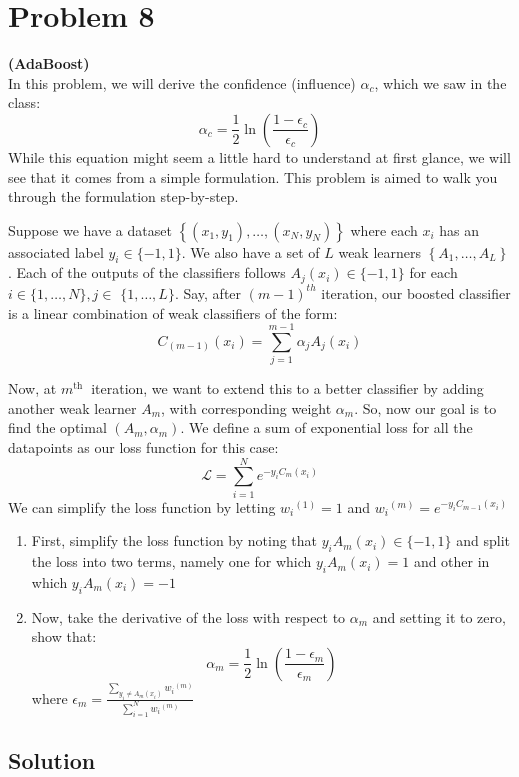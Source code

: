 \section*{Problem 8}

\textbf{(AdaBoost)}\\
In this problem, we will derive the confidence (influence) \( \alpha_{c} \), which we saw in the class:
\[
    \alpha_{c}=\frac{1}{2} \ln \left(\frac{1-\epsilon_{c}}{\epsilon_{c}}\right)
\]
While this equation might seem a little hard to understand at first glance, we will see that it comes from a simple formulation.
This problem is aimed to walk you through the formulation step-by-step.

Suppose we have a dataset \( \left \{\left(x_{1}, y_{1}\right), \ldots,\left(x_{N}, y_{N}\right)\right \} \) where each \( x_{i} \) has an associated label \( y_{i} \in \{-1,1\} \).
We also have a set of \( L \) weak learners \( \left \{A_{1}, \ldots, A_{L}\right \} \).
Each of the outputs of the classifiers follows \( A_{j}\left(x_{i}\right) \in \{-1,1\} \) for each \( i \in \{1, \ldots, N\}, j \in \) \( \{1, \ldots, L\} \).
Say, after \( (m-1)^{t h} \) iteration, our boosted classifier is a linear combination of weak classifiers of the form:
\[
    C_{(m-1)}\left(x_{i}\right)=\sum_{j=1}^{m-1} \alpha_{j} A_{j}\left(x_{i}\right)
\]

Now, at \( m^{\text {th }} \) iteration, we want to extend this to a better classifier by adding another weak learner \( A_{m} \), with corresponding weight \( \alpha_{m} \).
So, now our goal is to find the optimal \( \left(A_{m}, \alpha_{m}\right) \).
We define a sum of exponential loss for all the datapoints as our loss function for this case:
\[
    \mathcal{L}=\sum_{i=1}^{N} e^{-y_{i} C_{m}\left(x_{i}\right)}
\]
We can simplify the loss function by letting \( w_{i}{ }^{(1)}=1 \) and \( w_{i}{ }^{(m)}=e^{-y_{i} C_{m-1}\left(x_{i}\right)} \)
\begin{enumerate}[label= (\alph*), noitemsep, topsep=0pt]
    \item First, simplify the loss function by noting that \( y_{i} A_{m}\left(x_{i}\right) \in\{-1,1\} \) and split the loss into two terms, namely one for which \( y_{i} A_{m}\left(x_{i}\right)=1 \) and other in which \( y_{i} A_{m}\left(x_{i}\right)=-1 \)

    \item Now, take the derivative of the loss with respect to \( \alpha_{m} \) and setting it to zero, show that:
          \[
              \alpha_{m}=\frac{1}{2} \ln \left(\frac{1-\epsilon_{m}}{\epsilon_{m}}\right)
          \]
          where \( \epsilon_{m}=\frac{\sum_{y_{i} \neq A_{m}\left(x_{i}\right)} w_{i}{ }^{(m)}}{\sum_{i=1}^{N} w_{i}{ }^{(m)}} \)
\end{enumerate}

\subsection*{Solution}
